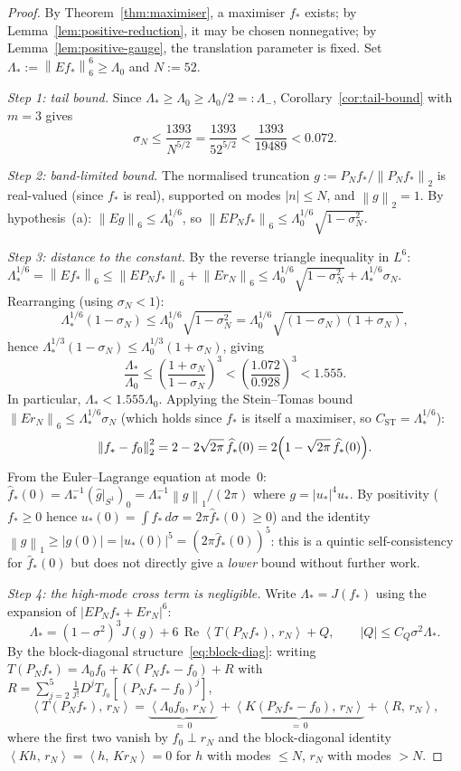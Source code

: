\documentclass[12pt]{article}
\theoremstyle{definition}
\theoremstyle{remark}
\newcommand{\wh}{\widehat}
\newcommand{\norm}[1]{\left\|#1\right\|}
\newcommand{\ip}[2]{\left\langle #1,\, #2\right\rangle}
\newcommand{\re}{\operatorname{Re}}
\begin{document}
\begin{proof}
  By Theorem~\ref{thm:maximiser}, a maximiser $f_*$ exists; by
  Lemma~\ref{lem:positive-reduction}, it may be chosen nonnegative;
  by Lemma~\ref{lem:positive-gauge}, the translation parameter is
  fixed.  Set $\Lambda_*:=\norm{Ef_*}_6^6\geq\Lambda_0$ and
  $N:=52$.

  \emph{Step 1: tail bound.}
  Since $\Lambda_*\geq\Lambda_0\geq\Lambda_0/2=:\Lambda_-$,
  Corollary~\ref{cor:tail-bound} with $m=3$ gives
  \[
    \sigma_N
    \leq\frac{1393}{N^{5/2}}
    =\frac{1393}{52^{5/2}}
    <\frac{1393}{19489}
    <0.072.
  \]

  \emph{Step 2: band-limited bound.}
  The normalised truncation $g:=P_Nf_*/\norm{P_Nf_*}_2$ is
  real-valued (since $f_*$ is real), supported on modes $|n|\leq N$,
  and $\norm{g}_2=1$.  By hypothesis~(a):
  $\norm{Eg}_6\leq\Lambda_0^{1/6}$, so
  $\norm{EP_Nf_*}_6\leq\Lambda_0^{1/6}\sqrt{1-\sigma_N^2}$.

  \emph{Step 3: distance to the constant.}
  By the reverse triangle inequality in $L^6$:
  $\Lambda_*^{1/6}=\norm{Ef_*}_6
  \leq\norm{EP_Nf_*}_6+\norm{Er_N}_6
  \leq\Lambda_0^{1/6}\sqrt{1-\sigma_N^2}+\Lambda_*^{1/6}\sigma_N$.
  Rearranging (using $\sigma_N<1$):
  \[
    \Lambda_*^{1/6}(1-\sigma_N)
    \leq\Lambda_0^{1/6}\sqrt{1-\sigma_N^2}
    =\Lambda_0^{1/6}\sqrt{(1-\sigma_N)(1+\sigma_N)},
  \]
  hence $\Lambda_*^{1/3}(1-\sigma_N)
  \leq\Lambda_0^{1/3}(1+\sigma_N)$, giving
  \begin{equation}\label{eq:lambda-ratio}
    \frac{\Lambda_*}{\Lambda_0}
    \leq\left(\frac{1+\sigma_N}{1-\sigma_N}\right)^3
    <\left(\frac{1.072}{0.928}\right)^3
    <1.555.
  \end{equation}
  In particular, $\Lambda_*<1.555\Lambda_0$.  Applying the
  Stein--Tomas bound $\norm{Er_N}_6\leq\Lambda_*^{1/6}\sigma_N$
  (which holds since $f_*$ is itself a maximiser, so $C_{\mathrm{ST}}
  =\Lambda_*^{1/6}$):
  \[
    \norm{f_*-f_0}_2^2
    =2-2\sqrt{2\pi}\,\wh f_*(0)
    =2\Bigl(1-\sqrt{2\pi}\,\wh f_*(0)\Bigr).
  \]
  From the Euler--Lagrange equation at mode~$0$:
  $\wh f_*(0)=\Lambda_*^{-1}(\wh g|_{S^1})_0
  =\Lambda_*^{-1}\norm{g}_1/(2\pi)$ where $g=|u_*|^4u_*$.
  By positivity ($f_*\geq 0$ hence $u_*(0)=\int f_*\,d\sigma
  =2\pi\wh f_*(0)\geq 0$) and the identity
  $\norm{g}_1\geq|g(0)| = |u_*(0)|^5 = (2\pi\wh f_*(0))^5$:
  this is a quintic self-consistency for $\wh f_*(0)$ but does not
  directly give a \emph{lower} bound without further work.

  \emph{Step 4: the high-mode cross term is negligible.}
  Write $\Lambda_*=J(f_*)$ using the expansion of
  $|EP_Nf_*+Er_N|^6$:
  \[
    \Lambda_*
    =(1-\sigma^2)^3J(g)
    +6\,\re\ip{T(P_Nf_*)}{r_N}+Q,
    \qquad |Q|\leq C_Q\sigma^2\Lambda_*.
  \]
  By the block-diagonal structure~\eqref{eq:block-diag}: writing
  $T(P_Nf_*)=\Lambda_0f_0+K(P_Nf_*-f_0)+R$ with
  $R=\sum_{j=2}^{5}\frac{1}{j!}D^jT_{f_0}[(P_Nf_*-f_0)^j]$,
  \[
    \ip{T(P_Nf_*)}{r_N}
    =\underbrace{\ip{\Lambda_0 f_0}{r_N}}_{=\,0}
    +\underbrace{\ip{K(P_Nf_*-f_0)}{r_N}}_{=\,0}
    +\ip{R}{r_N},
  \]
  where the first two vanish by $f_0\perp r_N$ and the block-diagonal
  identity $\ip{Kh}{r_N}=\ip{h}{Kr_N}=0$ for $h$ with modes $\leq N$,
  $r_N$ with modes $>N$.


\end{proof}
\end{document}
